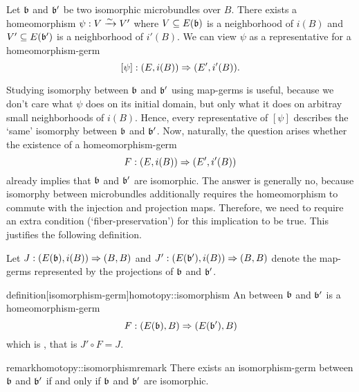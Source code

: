 \begin{myparagraph}
    Let $\bb$ and $\bb'$ be two isomorphic microbundles over $B$.
    There exists a homeomorphism $\psi: V \xrightarrow{\sim} V'$ where
    $V \sub E(\bb)$ is a neighborhood of $i(B)$
    and $V' \sub E(\bb')$ is a neighborhood of $i'(B)$.
    We can view $\psi$ as a representative for a homeomorphism-germ
    \[ [\psi]: (E, i(B)) \Rightarrow{} (E', i'(B)). \]
    
    Studying isomorphy between $\bb$ and $\bb'$
    using map-germs is useful,
    because we don't care what $\psi$ does on its initial domain,
    but only what it does on arbitray small neighborhoods of $i(B)$.
    Hence, every representative of $[\psi]$
    describes the `same' isomorphy between $\bb$ and $\bb'$.
    Now, naturally, the question arises whether
    the existence of a homeomorphism-germ
    \[ F: (E, i(B)) \Rightarrow{} (E', i'(B)) \]
    already implies that $\bb$ and $\bb'$ are isomorphic.
    The answer is generally no, because isomorphy between microbundles
    additionally requires 
    the homeomorphism to commute with the injection and projection maps.
    Therefore, we need to require an extra condition (`fiber-preservation')
    for this implication to be true.
    This justifies the following definition.
    
    Let $\germdef{J}{(E(\bb), i(B))}{(B, B)}$ and $\germdef{J'}{(E(\bb'), i(B))}{(B, B)}$
    denote the map-germs represented by the projections of $\bb$ and $\bb'$.
\end{myparagraph}

\begin{mystatement}{definition}[isomorphism-germ]{homotopy::isomorphism}
    An  between $\bb$ and $\bb'$ is a homeomorphism-germ 
    \[ \germdef{F}{(E(\bb), B)}{(E(\bb'), B)} \]
    which is , that is $J' \circ F = J$.
\end{mystatement}

\begin{mystatement}{remark}{homotopy::isomorphismremark}
    There exists an isomorphism-germ between $\bb$ and $\bb'$
    if and only if $\bb$ and $\bb'$ are isomorphic.
\end{mystatement}